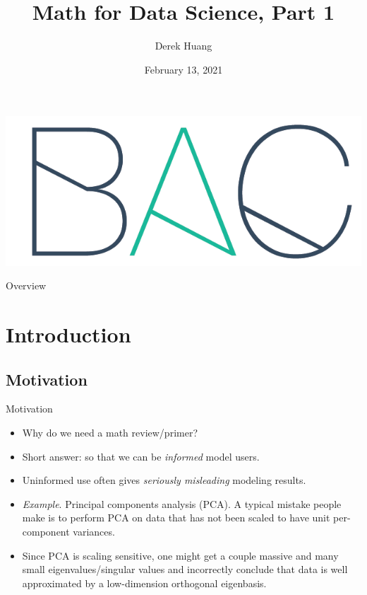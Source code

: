 \documentclass{beamer}
\title[Math for Data Science, Part 1]{Math for Data Science, Part 1}
\author[Derek Huang (BAC Advanced Team)]{Derek Huang}
\institute{BAC Advanced Team}
\date{February 13, 2021}
\numberwithin{equation}{section}
\begin{document}
\begin{frame}
    \titlepage
    \centering
    \includegraphics[scale = 0.1]{../bac_logo1.png}
\end{frame}

\begin{frame}{Overview}
	\tableofcontents
\end{frame}

\section{Introduction}

\subsection{Motivation}

\begin{frame}{Motivation}
    \begin{itemize}
        \item
        Why do we need a math review/primer?
        
        \item
        Short answer: so that we can be \textit{informed} model users.
        
        \item
        Uninformed use often gives \textit{seriously misleading} modeling
        results.

        \item
        \textit{Example}. Principal components analysis (PCA). A typical
        mistake people make\footnotemark{} is to perform PCA on data that has not been scaled to have unit
        per-component variances.

        \item
        Since PCA is scaling sensitive, one might get a couple massive
        and many small eigenvalues/singular values\footnotemark{} and incorrectly conclude that data is well approximated by a
        low-dimension orthogonal eigenbasis.
    \end{itemize}
\end{frame}
\end{document}

